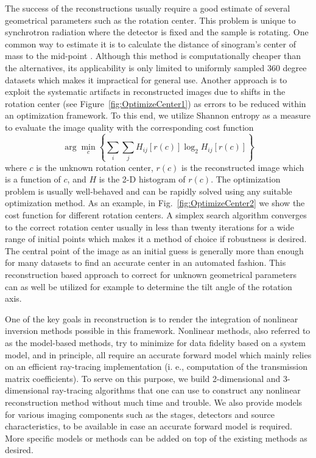 \documentclass[pdf]{iucr}              %
\begin{document}
The success of the reconstructions usually require a good estimate of several geometrical parameters such as the rotation center. This problem is unique to synchrotron radiation where the detector is fixed and the sample is rotating. One common way to estimate it is to calculate the distance of sinogram's center of mass to the mid-point \cite{Azevedo}. Although this method is computationally cheaper than the alternatives, its applicability is only limited to uniformly sampled 360 degree datasets which makes it impractical for general use. Another approach is to exploit the systematic artifacts in reconstructed images due to shifts in the rotation center \cite{donath_spie_2006} (see Figure~\ref{fig:OptimizeCenter1}) as errors to be reduced within an optimization framework. To this end, we utilize Shannon entropy as a measure to evaluate the image quality with the corresponding cost function
\begin{equation}
\arg \min_c \left\{\sum_i \sum_jH_{ij}\left[r(c)\right]\log_2 H_{ij}\left[r(c)\right]\right\}
\end{equation}
where $c$ is the unknown rotation center, $r(c)$ is the reconstructed image which is a function of $c$, and $H$ is the 2-D histogram of $r(c)$. The optimization problem is usually well-behaved and can be rapidly solved using any suitable optimization method.  As an example, in Fig.~\ref{fig:OptimizeCenter2} we show the cost function for different rotation centers. A simplex search algorithm converges to the correct rotation center usually in less than twenty iterations for a wide range of initial points which makes it a method of choice if robustness is desired. The central point of the image as an initial guess is generally more than enough for many datasets to find an accurate center in an automated fashion. This reconstruction based approach to correct for unknown geometrical parameters can as well be utilized for example to determine the tilt angle of the rotation axis.

One of the key goals in reconstruction is to render the integration of nonlinear inversion methods possible in this framework. Nonlinear methods, also referred to as the model-based methods, try to minimize for data fidelity based on a system model, and in principle, all require an accurate forward model which mainly relies on an efficient ray-tracing implementation (i. e., computation of the transmission matrix coefficients). To serve on this purpose, we build 2-dimensional and 3-dimensional ray-tracing algorithms that one can use to construct any nonlinear reconstruction method without much time and trouble. We also provide models for various imaging components such as the stages, detectors and source characteristics, to be available in case an accurate forward model is required. More specific models or methods can be added on top of the existing methods as desired.
\end{document}
